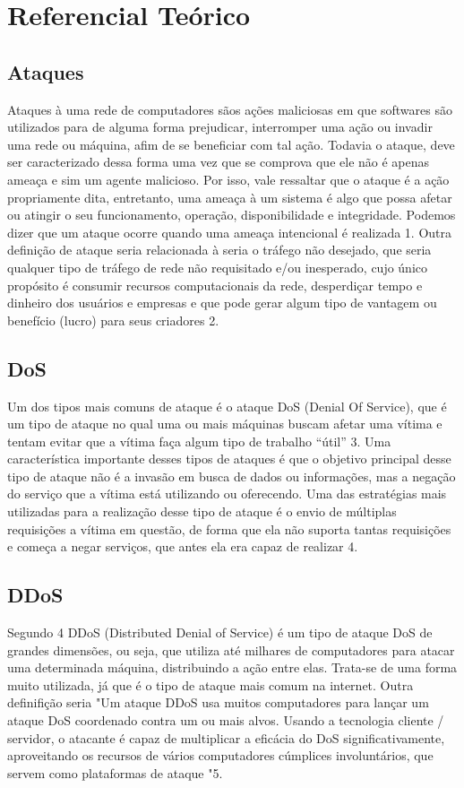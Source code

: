 \chapter{Referencial Teórico}
\label{CAP2}
\section{Ataques}
Ataques à uma rede de computadores sãos ações maliciosas em que softwares são utilizados para de alguma forma prejudicar, interromper uma ação ou invadir uma rede ou máquina, afim de se beneficiar com tal ação. Todavia o ataque, deve ser caracterizado dessa forma uma vez que se comprova que ele não é apenas ameaça e sim um agente malicioso. Por isso, vale ressaltar que o ataque é a ação propriamente dita, entretanto, uma ameaça à um sistema é algo que possa afetar ou atingir o seu funcionamento, operação, disponibilidade e integridade. Podemos dizer que um ataque ocorre quando uma ameaça intencional é realizada {1}.  Outra definição de ataque seria relacionada à seria o tráfego não desejado, que seria qualquer tipo de tráfego de rede não requisitado e/ou inesperado, cujo único propósito é consumir recursos computacionais da rede, desperdiçar tempo e dinheiro dos usuários e empresas e que pode gerar algum tipo de vantagem ou benefício (lucro) para seus criadores {2}. 
\section{DoS}
Um dos tipos mais comuns de ataque é o ataque DoS (Denial Of Service), que  é um tipo de ataque no qual uma ou mais máquinas buscam afetar uma vítima e tentam evitar que a vítima faça algum tipo de trabalho “útil” {3}. Uma característica importante desses tipos de ataques é que o objetivo principal desse tipo de ataque não é a invasão em busca de dados ou informações, mas a negação do serviço que a vítima está utilizando ou oferecendo.  Uma das estratégias mais utilizadas para a realização desse tipo de ataque é o envio de múltiplas requisições a vítima em questão, de forma que ela não suporta tantas requisições e começa a negar serviços, que antes ela era capaz de realizar {4}.

\section{DDoS}
Segundo {4} DDoS (Distributed Denial of Service) é um tipo de ataque DoS de grandes dimensões, ou seja, que utiliza até milhares de computadores para atacar uma determinada máquina, distribuindo a ação entre elas. Trata-se de uma forma muito utilizada, já que é o tipo de ataque mais comum na internet. Outra definifição seria "Um ataque DDoS usa muitos computadores para lançar um ataque DoS coordenado contra um ou mais alvos. Usando a tecnologia cliente / servidor, o atacante é capaz de multiplicar a eficácia do DoS significativamente, aproveitando os recursos de vários computadores cúmplices involuntários, que servem como plataformas de ataque "{5}.

